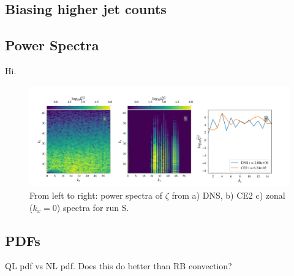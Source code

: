 \documentclass{jfm}
\begin{document}
\subsection{Biasing higher jet counts}
\label{sec:higher_jet}


\subsection{Power Spectra}
\label{sec:powerspec}
Hi.
\begin{figure}
  \centering
  \includegraphics[width=\textwidth]{../../figs/power_spectra_dns_ce2_run_S_write_501.pdf}
  \caption{From left to right: power spectra of $\zeta$ from a) DNS, b) CE2 c) zonal ($k_x = 0$) spectra for run S.}
  \label{fig:power_spec_S}
\end{figure}


\subsection{PDFs}
\label{sec:pdf}

QL pdf vs NL pdf.
Does this do better than RB convection?

\end{document}
